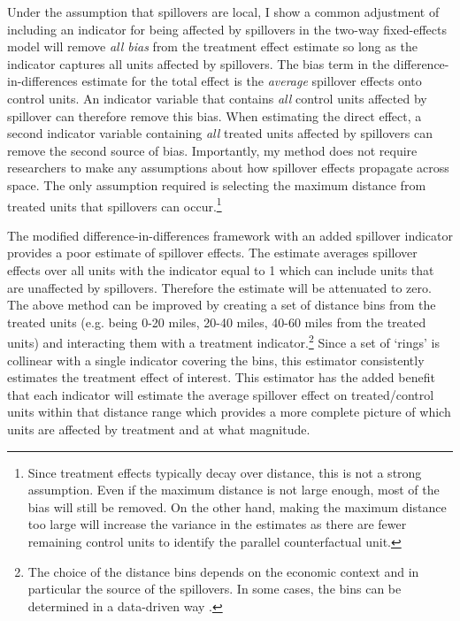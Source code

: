 \documentclass[11pt]{article}
\begin{document}
Under the assumption that spillovers are local, I show a common adjustment of including an indicator for being affected by spillovers in the two-way fixed-effects model will remove \emph{all bias} from the treatment effect estimate so long as the indicator captures all units affected by spillovers. The bias term in the difference-in-differences estimate for the total effect is the \textit{average} spillover effects onto control units. An indicator variable that contains \emph{all} control units affected by spillover can therefore remove this bias. When estimating the direct effect, a second indicator variable containing \emph{all} treated units affected by spillovers can remove the second source of bias. Importantly, my method does not require researchers to make any assumptions about how spillover effects propagate across space. The only assumption required is selecting the maximum distance from treated units that spillovers can occur.\footnote{Since treatment effects typically decay over distance, this is not a strong assumption. Even if the maximum distance is not large enough, most of the bias will still be removed. On the other hand, making the maximum distance too large will increase the variance in the estimates as there are fewer remaining control units to identify the parallel counterfactual unit.} 

The modified difference-in-differences framework with an added spillover indicator provides a poor estimate of spillover effects. The estimate averages spillover effects over all units with the indicator equal to 1 which can include units that are unaffected by spillovers. Therefore the estimate will be attenuated to zero. The above method can be improved by creating a set of distance bins from the treated units (e.g. being 0-20 miles, 20-40 miles, 40-60 miles from the treated units) and interacting them with a treatment indicator.\footnote{The choice of the distance bins depends on the economic context and in particular the source of the spillovers. In some cases, the bins can be determined in a data-driven way \citep{Butts_2021}.} Since a set of `rings' is collinear with a single indicator covering the bins, this estimator consistently estimates the treatment effect of interest. This estimator has the added benefit that each indicator will estimate the average spillover effect on treated/control units within that distance range which provides a more complete picture of which units are affected by treatment and at what magnitude. 
\end{document}

